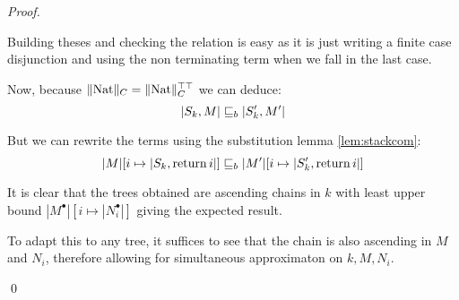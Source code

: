 \begin{ensps}
\begin{proof}
\begin{itemize}
            Building theses and checking the relation is easy as it is just 
            writing a finite case disjunction and using the non terminating 
            term when we fall in the last case.

            Now, because $\| \textnormal{Nat} \|_C = \| \textnormal{Nat} \|_C^{\top\top}$ we can 
            deduce:
            \begin{equation*}
                |S_k, M| \sqsubseteq_b |S_k', M'|
            \end{equation*}

            But we can rewrite the terms using the substitution lemma
            \ref{lem:stackcom}: 
            \begin{equation*}
                |M|[i \mapsto |S_k, \operatorname{return} i|] \sqsubseteq_b |M'|[ i \mapsto |S_k', \operatorname{return}
                i|]
            \end{equation*}

            It is clear that the trees obtained are ascending chains in $k$
            with least upper bound $|M^\bullet|[i \mapsto |N_i^\bullet|]$ 
            giving the expected result.

            To adapt this to any tree, it suffices to see that the chain 
            is also ascending in $M$ and $N_i$, therefore allowing for 
            simultaneous approximaton on $k,M,N_i$.
    \end{itemize} 

\qed\end{proof}
\end{ensps}

